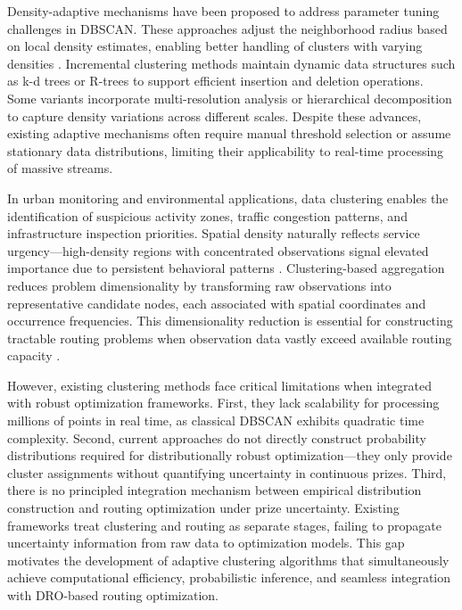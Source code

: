 \documentclass[preprint,12pt,authoryear]{elsarticle}
\theoremstyle{definition}
\begin{document}
Density-adaptive mechanisms have been proposed to address parameter tuning challenges in DBSCAN. These approaches adjust the neighborhood radius based on local density estimates, enabling better handling of clusters with varying densities \citep{wei2024adaptive}. Incremental clustering methods maintain dynamic data structures such as k-d trees or R-trees to support efficient insertion and deletion operations. Some variants incorporate multi-resolution analysis or hierarchical decomposition to capture density variations across different scales. Despite these advances, existing adaptive mechanisms often require manual threshold selection or assume stationary data distributions, limiting their applicability to real-time processing of massive streams.

In urban monitoring and environmental applications, data clustering enables the identification of suspicious activity zones, traffic congestion patterns, and infrastructure inspection priorities. Spatial density naturally reflects service urgency—high-density regions with concentrated observations signal elevated importance due to persistent behavioral patterns \citep{hou2024wind}. Clustering-based aggregation reduces problem dimensionality by transforming raw observations into representative candidate nodes, each associated with spatial coordinates and occurrence frequencies. This dimensionality reduction is essential for constructing tractable routing problems when observation data vastly exceed available routing capacity \citep{ros2022detection}.

However, existing clustering methods face critical limitations when integrated with robust optimization frameworks. First, they lack scalability for processing millions of points in real time, as classical DBSCAN exhibits quadratic time complexity. Second, current approaches do not directly construct probability distributions required for distributionally robust optimization---they only provide cluster assignments without quantifying uncertainty in continuous prizes. Third, there is no principled integration mechanism between empirical distribution construction and routing optimization under prize uncertainty. Existing frameworks treat clustering and routing as separate stages, failing to propagate uncertainty information from raw data to optimization models. This gap motivates the development of adaptive clustering algorithms that simultaneously achieve computational efficiency, probabilistic inference, and seamless integration with DRO-based routing optimization.
\end{document}
